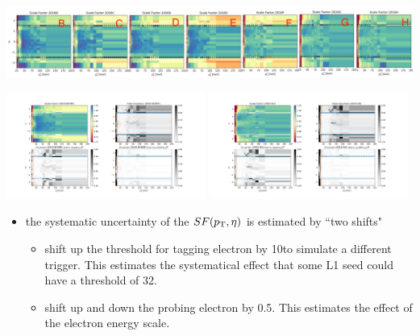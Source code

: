 \begin{frame}{}
    \begin{center}
        \includegraphics[width=\textwidth]{chapters/Analysis/sectionCalibration/figures/eTrigger/result_period.png}
    \end{center}
\end{frame}



\begin{frame}{}
\smaller
    \begin{center}
        \includegraphics[width=0.49\textwidth,trim=3cm 0 3cm 0, clip]{chapters/Analysis/sectionCalibration/figures/eTrigger/result_BCDEF.png}
        \includegraphics[width=0.49\textwidth,trim=3cm 0 3cm 0, clip]{chapters/Analysis/sectionCalibration/figures/eTrigger/result_GH.png}
    \end{center}
    
    \begin{itemize}
        \item the systematic uncertainty of the $SF (p_{\mathrm{T}}, \eta)$ is estimated by ``two shifts"
        \begin{itemize}
        \smaller
            \item shift up the \pt threshold for tagging electron by 10\GeV to simulate a different trigger. This estimates the systematical effect that some L1 seed could have a threshold of 32\GeV.
            \item shift up and down the probing electron \pt by 0.5\GeV. This estimates the effect of the electron energy scale.
        \end{itemize}
    \end{itemize}
\end{frame}





